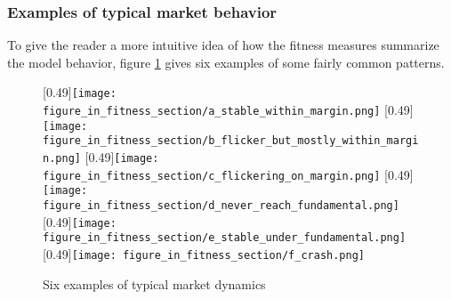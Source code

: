 \subsubsection{Examples of typical market behavior}
To give the reader a more intuitive idea of how the fitness measures summarize the model behavior, figure \ref{figure:typical_fitness_cases} gives six examples of some fairly common patterns.
\begin{figure} 
\centering
{}
[0.49\linewidth]{\texttt{[image: figure\_in\_fitness\_section/a\_stable\_within\_margin.png]}}
[0.49\linewidth]{\texttt{[image: figure\_in\_fitness\_section/b\_flicker\_but\_mostly\_within\_margin.png]}}
\vspace{0.5cm}
[0.49\linewidth]{\texttt{[image: figure\_in\_fitness\_section/c\_flickering\_on\_margin.png]}}
[0.49\linewidth]{\texttt{[image: figure\_in\_fitness\_section/d\_never\_reach\_fundamental.png]}}
\vspace{0.5cm}
[0.49\linewidth]{\texttt{[image: figure\_in\_fitness\_section/e\_stable\_under\_fundamental.png]}}
[0.49\linewidth]{\texttt{[image: figure\_in\_fitness\_section/f\_crash.png]}}
\caption{Six examples of typical market dynamics}
\label{figure:typical_fitness_cases}
\end{figure}





\begin{comment}
\begin{figure}
\centering
\subcaptionbox{Market with fairly stable prices, but flickering over and under the stability margin. \label{figure:tradeprice_exaples_fitness_a}}
[0.49\linewidth]{\texttt{[image: issue\_113\_tradeprice\_plots/all/low\_stdev\_but\_not\_stable.png]}}
\subcaptionbox{\label{figure:tradeprice_exaples_fitness_b}}
[0.49\linewidth]{\texttt{[image: issue\_113\_tradeprice\_plots/all/low\_stdev\_and\_stable.png]}}
\subcaptionbox{\label{figure:tradeprice_exaples_fitness_c}}
[0.49\linewidth]{\texttt{[image: issue\_113\_tradeprice\_plots/all/high\_stdev\_but\_stable.png]}}
\caption{title}
\label{figure:tradeprice_exaples_fitness}
\end{figure}
\end{comment}



